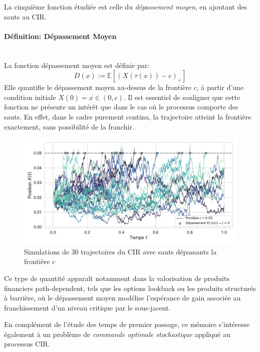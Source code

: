 La cinquième fonction étudiée est celle du \textit{dépassement moyen}, en ajoutant des sauts au \acs{CIR}.
\paragraph{Définition: Dépassement Moyen}\mbox{}\\
La fonction dépassement moyen est définie par: 
\begin{equation}\label{overshoot}
    D(x):=\mathds{E}\left[{(X(\tau(x))-c)}_+\right]
\end{equation}
Elle quantifie le dépassement moyen au-dessus de la frontière \( c \), à partir d'une condition initiale \( X(0) = x \in (0, c) \). Il est essentiel de souligner que cette fonction ne présente un intérêt que dans le cas où le processus comporte des sauts. En effet, dans le cadre purement continu, la trajectoire atteint la frontière exactement, sans possibilité de la franchir.
\begin{figure}[htb]
    \centering
    \includegraphics[width=0.9\linewidth]{img/intro/overshoot.pdf}
    \caption{Simulations de 30 trajectoires du \acs{CIR} avec sauts dépassants la frontière $c$}\label{fig:OvershootViz}
\end{figure}
\FloatBarrier Ce type de quantité apparaît notamment dans la valorisation de produits financiers path-dependent, tels que les options lookback ou les produits structurés à barrière, où le dépassement moyen modélise l'espérance de gain associée au franchissement d'un niveau critique par le sous-jacent. 

En complément de l'étude des temps de premier passage, ce mémoire s'intéresse également à un problème de \textit{commande optimale stochastique} appliqué au processus \acs{CIR}.
